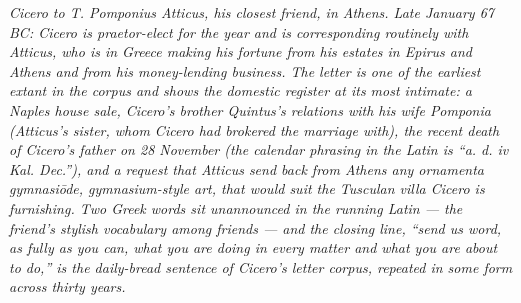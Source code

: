 
\textit{Cicero to T. Pomponius Atticus, his closest friend,
in Athens. Late January 67 BC: Cicero is praetor-elect for
the year and is corresponding routinely with Atticus, who
is in Greece making his fortune from his estates in Epirus
and Athens and from his money-lending business. The letter
is one of the earliest extant in the corpus and shows the
domestic register at its most intimate: a Naples house
sale, Cicero's brother Quintus's relations with his wife
Pomponia (Atticus's sister, whom Cicero had brokered the
marriage with), the recent death of Cicero's father on 28
November (the calendar phrasing in the Latin is ``a. d. iv
Kal. Dec.''), and a request that Atticus send back from
Athens any \textit{ornamenta gymnasi\=ode}, gymnasium-style
art, that would suit the Tusculan villa Cicero is
furnishing. Two Greek words sit unannounced in the running
Latin --- the friend's stylish vocabulary among friends ---
and the closing line, ``send us word, as fully as you can,
what you are doing in every matter and what you are about
to do,'' is the daily-bread sentence of Cicero's letter
corpus, repeated in some form across thirty years.}
